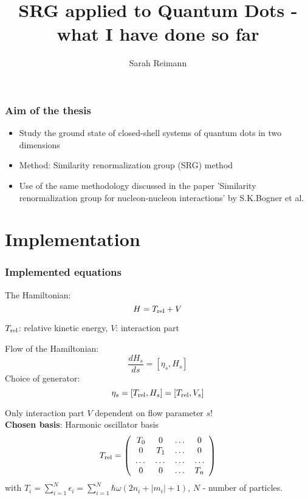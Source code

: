 \documentclass[9pt]{beamer}
\title[SRG Quantum Dots]{SRG applied to Quantum Dots - what I have done so far}
\author{Sarah Reimann}
\institute[UiO]{Department of Physics, University of Oslo, Norway}
\begin{document}
\begin{frame}
\titlepage
\end{frame}



\begin{frame}
\frametitle{Aim of the thesis}
\begin{itemize}
\item Study the ground state of closed-shell systems of quantum dots in two dimensions
\item Method: Similarity renormalization group (SRG) method 
\item Use of the same methodology discussed in the paper 'Similarity renormalization group for nucleon-nucleon interactions' by S.K.Bogner et al.
\end{itemize}
\end{frame}


\section{Implementation}
\begin{frame}
\frametitle{Implemented equations}
The Hamiltonian:
\[
H = T_{\rm rel} + V
\]
\begin{center}
$T_{\rm rel}$: relative kinetic energy, $V$: interaction part
\end{center}
Flow of the Hamiltonian:
\[
\frac{d H_s}{ds} = \left[\eta_s, H_s \right]
\]
Choice of generator:
\[
\eta_s = \left[T_{\rm rel}, H_s\right] = \left[T_{\rm rel}, V_s\right]
\]

Only interaction part $V$ dependent on flow parameter $s$!\\

\textbf{Chosen basis}: Harmonic oscillator basis
\[
T_{\rm rel} =
 \left( \begin{array}{cccc}
T_0 & 0 & \dots & 0 \\
0 & T_1 & \dots & 0 \\
\dots & \dots & \dots & \dots \\
0 & 0 & \dots & T_n \end{array} \right)
\]
with $T_i = \sum\limits_{i=1}^N \epsilon_i = \sum\limits_{i=1}^N \hbar\omega (2n_i + |m_i| +1)$,
 $N$ - number of particles.
\end{frame}
\end{document}

